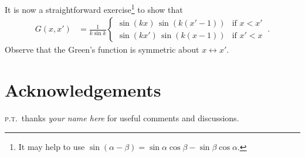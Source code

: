\documentclass[12pt]{article}
\numberwithin{equation}{section}    %
\begin{document}
It is now a straightforward exercise\footnote{It may help to use $\sin(\alpha-\beta) = \sin\alpha\cos\beta -\sin\beta\cos\alpha$.} to show that
\begin{align}
  G(x,x') &=
  \frac{1}{k\sin k}
  \begin{cases}
  \sin(kx)\, \sin(k(x'-1)) & \text{if $x<x'$}\\
  \sin(kx')\, \sin(k(x-1)) & \text{if $x'<x$}
  \end{cases} \ .
\end{align}
Observe that the Green’s function is symmetric about $x\leftrightarrow x'$.








































\section*{Acknowledgements}


%
\textsc{p.t.}\ thanks 
\emph{your name here}
for useful comments and discussions. 
%



% 
\end{document}
